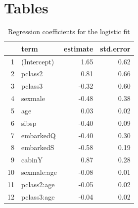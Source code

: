 \documentclass[9pt]{extarticle}
\begin{document}
\section{Tables}
\begin{table}[H]
	\centering
	\begin{tabular}{rlrr}
		\hline
		& term & estimate & std.error \\ 
		\hline
		1 & (Intercept) & 1.65 & 0.62 \\ 
		2 & pclass2 & 0.81 & 0.66 \\ 
		3 & pclass3 & -0.32 & 0.60 \\ 
		4 & sexmale & -0.48 & 0.38 \\ 
		5 & age & 0.03 & 0.02 \\ 
		6 & sibsp & -0.40 & 0.09 \\ 
		7 & embarkedQ & -0.40 & 0.30 \\ 
		8 & embarkedS & -0.58 & 0.19 \\ 
		9 & cabinY & 0.87 & 0.28 \\ 
		10 & sexmale:age & -0.08 & 0.01 \\ 
		11 & pclass2:age & -0.05 & 0.02 \\ 
		12 & pclass3:age & -0.04 & 0.02 \\ 
		\hline
	\end{tabular}
\caption{Regression coefficients for the logistic fit}
\label{tab:regco}
\end{table}
\end{document}
